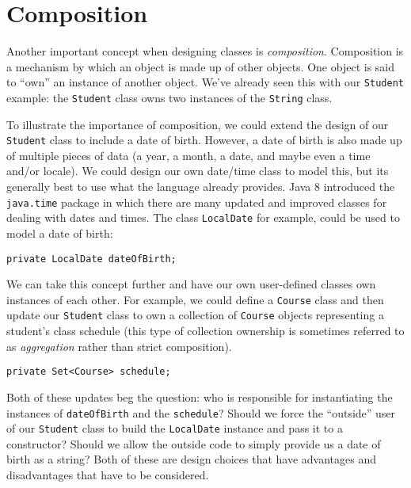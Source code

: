 \section{Composition}

Another important concept when designing classes is \emph{composition}.
Composition is a mechanism by which an object is made up of other objects.
One object is said to ``own'' an instance of another object.  We've
already seen this with our \texttt{Student} example: the
\texttt{Student} class owns two instances of the
\texttt{String} class.  

To illustrate the importance of composition, we could extend the 
design of our \texttt{Student} class to include a date of 
birth.  However, a date of birth is also made up of multiple pieces
of data (a year, a month, a date, and maybe even a time and/or locale).
We could design our own date/time class to model this, but its generally
best to use what the language already provides.  Java 8 introduced the
\texttt{java.time} package in which there are many updated
and improved classes for dealing with dates and times.  The class
\texttt{LocalDate} for example, could be used to model a
date of birth:

\begin{verbatim}
private LocalDate dateOfBirth;
\end{verbatim}

We can take this concept further and have our own user-defined classes
own instances of each other.  For example, we could define a 
\texttt{Course} class and then update our \texttt{Student} class to own a collection of \texttt{Course}
objects representing a student's class schedule (this type of
collection ownership is sometimes referred to as \emph{aggregation}
rather than strict composition).

\begin{verbatim}
private Set<Course> schedule;
\end{verbatim}

Both of these updates beg the question: who is responsible for instantiating
the instances of \texttt{dateOfBirth} and the 
\texttt{schedule}?  Should we force the ``outside'' user
of our \texttt{Student} class to build the 
\texttt{LocalDate} instance and pass it to a constructor?
Should we allow the outside code to simply provide us a date of birth
as a string?  Both of these are design choices that have advantages
and disadvantages that have to be considered.

